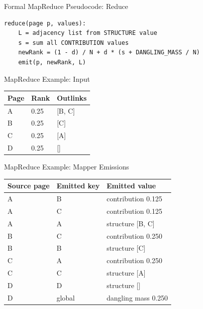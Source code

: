 \documentclass[aspectratio=169,11pt]{beamer}
\begin{document}
\begin{frame}[fragile]{Formal MapReduce Pseudocode: Reduce}
\begin{verbatim}
reduce(page p, values):
    L = adjacency list from STRUCTURE value
    s = sum all CONTRIBUTION values
    newRank = (1 - d) / N + d * (s + DANGLING_MASS / N)
    emit(p, newRank, L)
\end{verbatim}
\end{frame}

\begin{frame}{MapReduce Example: Input}
\begin{center}
\begin{tabular}{lll}
\toprule
Page & Rank & Outlinks \\
\midrule
A & 0.25 & [B, C] \\
B & 0.25 & [C] \\
C & 0.25 & [A] \\
D & 0.25 & [] \\
\bottomrule
\end{tabular}
\end{center}
\end{frame}

\begin{frame}{MapReduce Example: Mapper Emissions}
\begin{center}
\small
\begin{tabular}{lll}
\toprule
Source page & Emitted key & Emitted value \\
\midrule
A & B & contribution 0.125 \\
A & C & contribution 0.125 \\
A & A & structure [B, C] \\
B & C & contribution 0.250 \\
B & B & structure [C] \\
C & A & contribution 0.250 \\
C & C & structure [A] \\
D & D & structure [] \\
D & global & dangling mass 0.250 \\
\bottomrule
\end{tabular}
\end{center}
\end{frame}
\end{document}
